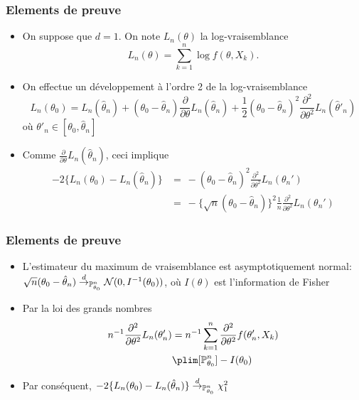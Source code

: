 \begin{frame}
\frametitle{Elements de preuve}
\begin{itemize}
\item On suppose que $d=1$. On note $L_n(\theta)$ la log-vraisemblance
\[
L_n(\theta)= \sum_{k=1}^n \log f(\theta,X_k).
\]
\item On effectue un développement à l'ordre 2 de la log-vraisemblance
\[
L_n(\theta_0)=L_n(\hat{\theta}_{n})+(\theta_{0}-\hat{\theta}_{n})\frac{\partial}{\partial\theta}L_n(\hat{\theta}_n)+
\frac{1}{2}(\theta_{0}-\hat{\theta}_{n})^{2}\frac{\partial^{2}}{\partial\theta^{2}}L_n(\hat{\theta}'_n)
\]
où $\theta'_n \in [\theta_0,\hat{\theta}_n]$
\item Comme $\frac{\partial}{\partial\theta}L_n(\hat{\theta}_n)$, ceci implique
\begin{align*}
-2 \{ L_n(\theta_{0})-L_n(\hat{\theta}_{n}) \} 
&=\ -(\theta_{0}-\hat{\theta}_{n})^{2}\frac{\partial^{2}}{\partial\theta^{2}}L_n(\theta_{n}') \\
&=\ - \{\sqrt{n} (\theta_{0}-\hat{\theta}_{n})\}^{2} \frac{1}{n} \frac{\partial^{2}}{\partial\theta^{2}}L_n(\theta_{n}')
\end{align*}
\end{itemize}
\end{frame}

\begin{frame}
\frametitle{Elements de preuve}
\begin{itemize}
\item L'estimateur du maximum de vraisemblance est asymptotiquement normal: $\sqrt{n} (\theta_{0}-\hat{\theta}_{n}) \stackrel{d}{\rightarrow}_{\operatorname{{\mathbb P}}_{\theta_0}^n} \mathcal{N}(0,I^{-1}(\theta_0))$, où $I(\theta)$ est l'information de Fisher
\item Par la loi des grands nombres 
\begin{align*}
n^{-1} \frac{\partial^{2}}{\partial\theta^{2}}L_n(\theta_{n}') 
&= n^{-1} \sum_{k=1}^n \frac{\partial^{2}}{\partial\theta^{2}} f(\theta'_n,X_k)\\
&\plim[\PP_{\theta_0}^n] -I(\theta_0) 
\end{align*}
\item Par conséquent, $-2 \{ L_n(\theta_{0})-L_n(\hat{\theta}_{n}) \} \stackrel{d}{\rightarrow}_{\operatorname{{\mathbb P}}_{\theta_0}^n}  \chi^2_1$
\end{itemize}
\end{frame}






